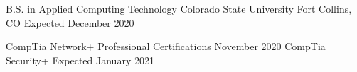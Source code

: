 



\begin{cventries}
  \cventry
    {B.S. in Applied Computing Technology} %
    {Colorado State University} %
    {Fort Collins, CO} %
    {Expected December 2020} %
    {}

  \certentry
    {CompTia Network+} %
    {Professional Certifications} %
    {November 2020} %
    {CompTia Security+} %
    {Expected January 2021} %
    \vspace{5.0mm}
\end{cventries}
